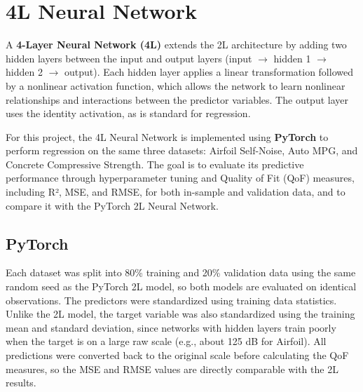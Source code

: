 \documentclass{article}
\begin{document}
\section{4L Neural Network}
A \textbf{4-Layer Neural Network (4L)} extends the 2L architecture by adding two hidden layers between the input and output layers (input $\rightarrow$ hidden 1 $\rightarrow$ hidden 2 $\rightarrow$ output). Each hidden layer applies a linear transformation followed by a nonlinear activation function, which allows the network to learn nonlinear relationships and interactions between the predictor variables. The output layer uses the identity activation, as is standard for regression.
\medskip

For this project, the 4L Neural Network is implemented using \textbf{PyTorch} to perform regression on the same three datasets: Airfoil Self-Noise, Auto MPG, and Concrete Compressive Strength. The goal is to evaluate its predictive performance through hyperparameter tuning and Quality of Fit (QoF) measures, including R², MSE, and RMSE, for both in-sample and validation data, and to compare it with the PyTorch 2L Neural Network.

\subsection{PyTorch}
Each dataset was split into 80\% training and 20\% validation data using the same random seed as the PyTorch 2L model, so both models are evaluated on identical observations. The predictors were standardized using training data statistics. Unlike the 2L model, the target variable was also standardized using the training mean and standard deviation, since networks with hidden layers train poorly when the target is on a large raw scale (e.g., about 125 dB for Airfoil). All predictions were converted back to the original scale before calculating the QoF measures, so the MSE and RMSE values are directly comparable with the 2L results.
\medskip
\end{document}
